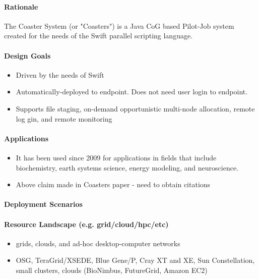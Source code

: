 \documentclass{sig-alternate}
\begin{document}
\paragraph{Rationale}

The Coaster System (or "Coasters") is a Java CoG based Pilot-Job system
created for the needs of the Swift parallel scripting language.

\paragraph{Design Goals}

\begin{itemize}
  \item Driven by the needs of Swift
  \item Automatically-deployed to endpoint. Does not need user login to endpoint.
  \item Supports file staging, on-demand opportunistic multi-node allocation, 
  remote log gin, and remote monitoring
\end{itemize}

\paragraph{Applications}

\begin{itemize}
  \item It has been used since 2009 for applications in fields 
that include biochemistry, earth systems science, 
energy modeling, and neuroscience.
  \item Above claim made in Coasters paper - need to obtain citations
\end{itemize}

\paragraph{Deployment Scenarios}


\paragraph{Resource Landscape (e.g. grid/cloud/hpc/etc)}

\begin{itemize}
  \item grids, clouds, and ad-hoc desktop-computer networks 
  \item OSG, TeraGrid/XSEDE, Blue Gene/P, Cray XT and XE, 
  Sun Constellation, small clusters, clouds (BioNimbus, FutureGrid,
  Amazon EC2)
\end{itemize}
\end{document}
